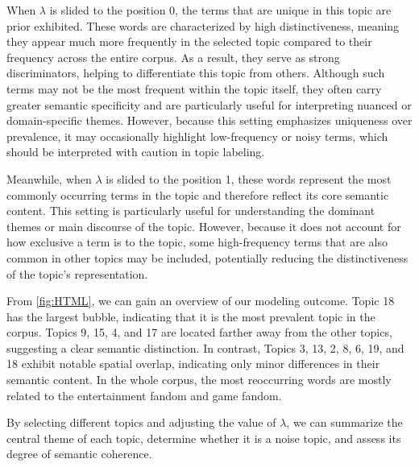 \documentclass[12pt]{article}
\numberwithin{figure}{section}  %
\begin{document}
	When $\lambda$ is slided to the position 0, the terms that are unique in
	this topic are prior exhibited. These words are characterized by high
	distinctiveness, meaning they appear much more frequently in the selected
	topic compared to their frequency across the entire corpus. As a result,
	they serve as strong discriminators, helping to differentiate this topic
	from others. Although such terms may not be the most frequent within the
	topic itself, they often carry greater semantic specificity and are
	particularly useful for interpreting nuanced or domain-specific themes.
	However, because this setting emphasizes uniqueness over prevalence, it may
	occasionally highlight low-frequency or noisy terms, which should be
	interpreted with caution in topic labeling.
	
	Meanwhile, when $\lambda$ is slided to the position 1, these words represent
	the most commonly occurring terms in the topic and therefore reflect its
	core semantic content. This setting is particularly useful for understanding
	the dominant themes or main discourse of the topic. However, because it does
	not account for how exclusive a term is to the topic, some high-frequency
	terms that are also common in other topics may be included, potentially
	reducing the distinctiveness of the topic’s representation.
	 
	From \cref{fig:HTML}, we can gain an overview of our modeling outcome.
	Topic 18 has the largest bubble, indicating that it is the most prevalent
	topic in the corpus. Topics 9, 15, 4, and 17 are located farther away from
	the other topics, suggesting a clear semantic distinction. In contrast,
	Topics 3, 13, 2, 8, 6, 19, and 18 exhibit notable spatial overlap,
	indicating only minor differences in their semantic content. In the whole
	corpus, the most reoccurring words are mostly related to the entertainment
	fandom and game fandom.
	
	By selecting different topics and adjusting the value of $\lambda$, we can
	summarize the central theme of each topic, determine whether it is a noise
	topic, and assess its degree of semantic coherence.
	
\end{document}
